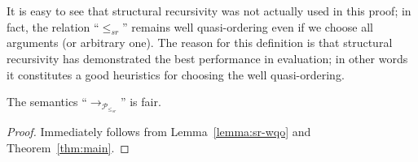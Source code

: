 It is easy to see that structural recursivity was not actually used in this proof; in fact, the relation ``$\leq_{sr}$'' remains well quasi-ordering even if we choose all arguments (or
arbitrary one). The reason for this definition is that structural recursivity has demonstrated the best performance in evaluation; in other words it constitutes a good
heuristics for choosing the well quasi-ordering.

\begin{corollary}
  The semantics ``$\rightarrow_{\mathcal{P}_{\leq_{sr}}}$'' is fair.
\end{corollary}
\begin{proof}
  Immediately follows from Lemma~\ref{lemma:sr-wqo} and Theorem~\ref{thm:main}.
\end{proof}
